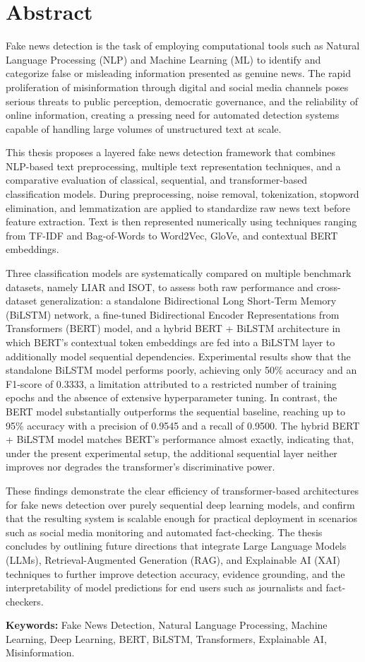 
\sloppy
\chapter*{\centering Abstract}
\onehalfspacing

Fake news detection is the task of employing computational tools such as Natural Language Processing (NLP) and Machine Learning (ML) to identify and categorize false or misleading information presented as genuine news. The rapid proliferation of misinformation through digital and social media channels poses serious threats to public perception, democratic governance, and the reliability of online information, creating a pressing need for automated detection systems capable of handling large volumes of unstructured text at scale.

This thesis proposes a layered fake news detection framework that combines NLP-based text preprocessing, multiple text representation techniques, and a comparative evaluation of classical, sequential, and transformer-based classification models. During preprocessing, noise removal, tokenization, stopword elimination, and lemmatization are applied to standardize raw news text before feature extraction. Text is then represented numerically using techniques ranging from TF-IDF and Bag-of-Words to Word2Vec, GloVe, and contextual BERT embeddings.

Three classification models are systematically compared on multiple benchmark datasets, namely LIAR and ISOT, to assess both raw performance and cross-dataset generalization: a standalone Bidirectional Long Short-Term Memory (BiLSTM) network, a fine-tuned Bidirectional Encoder Representations from Transformers (BERT) model, and a hybrid BERT + BiLSTM architecture in which BERT's contextual token embeddings are fed into a BiLSTM layer to additionally model sequential dependencies. Experimental results show that the standalone BiLSTM model performs poorly, achieving only 50\% accuracy and an F1-score of 0.3333, a limitation attributed to a restricted number of training epochs and the absence of extensive hyperparameter tuning. In contrast, the BERT model substantially outperforms the sequential baseline, reaching up to 95\% accuracy with a precision of 0.9545 and a recall of 0.9500. The hybrid BERT + BiLSTM model matches BERT's performance almost exactly, indicating that, under the present experimental setup, the additional sequential layer neither improves nor degrades the transformer's discriminative power.

These findings demonstrate the clear efficiency of transformer-based architectures for fake news detection over purely sequential deep learning models, and confirm that the resulting system is scalable enough for practical deployment in scenarios such as social media monitoring and automated fact-checking. The thesis concludes by outlining future directions that integrate Large Language Models (LLMs), Retrieval-Augmented Generation (RAG), and Explainable AI (XAI) techniques to further improve detection accuracy, evidence grounding, and the interpretability of model predictions for end users such as journalists and fact-checkers.

\vspace{0.5in}
\noindent
{\bf Keywords:} Fake News Detection, Natural Language Processing, Machine Learning, Deep Learning, BERT, BiLSTM, Transformers, Explainable AI, Misinformation.
